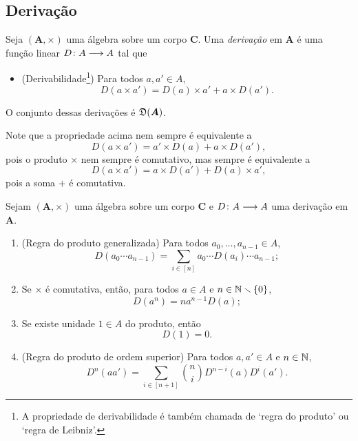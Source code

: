 \subsection{Derivação}

\begin{definition}
Seja $(\bm A,\times)$ uma álgebra sobre um corpo $\bm C$. Uma \emph{derivação} em $\bm A$ é uma função linear ${D}\colon {A} \longrightarrow {A}$ tal que
	\begin{itemize}
	\item (Derivabilidade\footnote{A propriedade de derivabilidade é também chamada de `regra do produto' ou `regra de Leibniz'.}) Para todos $a,a' \in A$,
		\begin{equation*}
		D(a \times a') = D(a) \times a' + a \times D(a').
		\end{equation*}
	\end{itemize}
O conjunto dessas derivações é $\mathfrak{D}(\bm A)$.
\end{definition}

Note que a propriedade acima nem sempre é equivalente a
	\begin{equation*}
	D(a \times a') = a' \times D(a) + a \times D(a'),
	\end{equation*}
pois o produto $\times$ nem sempre é comutativo, mas sempre é equivalente a
	\begin{equation*}
	D(a \times a') = a \times D(a') + D(a) \times a',
	\end{equation*}
pois a soma $+$ é comutativa.

\begin{proposition}
Sejam $(\bm A,\times)$ uma álgebra sobre um corpo $\bm C$ e ${D}\colon {A} \longrightarrow {A}$ uma derivação em $\bm A$.
	\begin{enumerate}
	\item (Regra do produto generalizada) Para todos $a_0,\ldots,a_{n-1} \in A$,
		\begin{equation*}
		D(a_0 \cdots a_{n-1}) = \sum_{i \in [n]} a_0 \cdots D(a_i) \cdots a_{n-1};
		\end{equation*}
	\item Se $\times$ é comutativa, então, para todos $a \in A$ e $n \in \mathbb{N} \smallsetminus \{0\}$,
		\begin{equation*}
		D(a^n) = na^{n-1}D(a);
		\end{equation*}
	\item Se existe unidade $1 \in A$ do produto, então
		\begin{equation*}
		D(1)=0.
		\end{equation*}
	\item (Regra do produto de ordem superior) Para todos $a,a' \in A$ e $n \in \mathbb{N}$,
		\begin{equation*}
		D^n(aa') = \sum_{i \in [n+1]} \binom{n}{i} D^{n-i}(a)D^i(a').
		\end{equation*}
	\end{enumerate}
\end{proposition}

